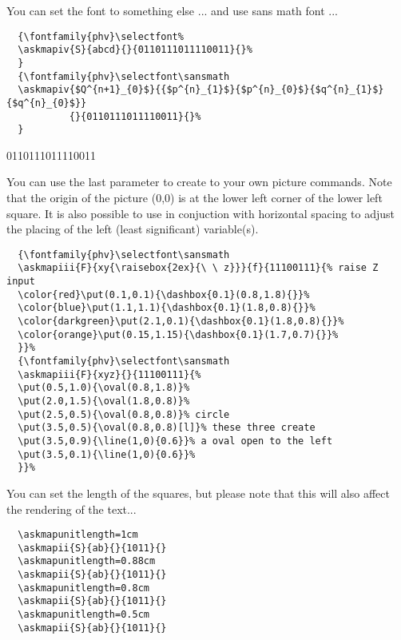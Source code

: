 \documentclass[a4paper,10pt]{ltxdoc}
\begin{document}
You can set the font to something else ... and use sans math font ...
\begin{verbatim}
  {\fontfamily{phv}\selectfont%
  \askmapiv{S}{abcd}{}{0110111011110011}{}%
  }
  {\fontfamily{phv}\selectfont\sansmath
  \askmapiv{$Q^{n+1}_{0}$}{{$p^{n}_{1}$}{$p^{n}_{0}$}{$q^{n}_{1}$}{$q^{n}_{0}$}}
           {}{0110111011110011}{}%
  }
\end{verbatim}
{\selectfont%
%
}
{\selectfont\sansmath
{}
         {}{0110111011110011}{}%
}
\bigskip\bigskip

You can use the last parameter to create to your own picture commands. Note
that the origin of the picture (0,0) is at the lower left corner of the lower
left square. It is also possible to use  in conjuction with
horizontal spacing to adjust the placing of the left (least significant)
variable(s).

\begin{verbatim}
  {\fontfamily{phv}\selectfont\sansmath
  \askmapiii{F}{xy{\raisebox{2ex}{\ \ z}}}{f}{11100111}{% raise Z input
  \color{red}\put(0.1,0.1){\dashbox{0.1}(0.8,1.8){}}%
  \color{blue}\put(1.1,1.1){\dashbox{0.1}(1.8,0.8){}}%
  \color{darkgreen}\put(2.1,0.1){\dashbox{0.1}(1.8,0.8){}}%
  \color{orange}\put(0.15,1.15){\dashbox{0.1}(1.7,0.7){}}%
  }}%
  {\fontfamily{phv}\selectfont\sansmath
  \askmapiii{F}{xyz}{}{11100111}{%
  \put(0.5,1.0){\oval(0.8,1.8)}%
  \put(2.0,1.5){\oval(1.8,0.8)}%
  \put(2.5,0.5){\oval(0.8,0.8)}% circle
  \put(3.5,0.5){\oval(0.8,0.8)[l]}% these three create
  \put(3.5,0.9){\line(1,0){0.6}}% a oval open to the left
  \put(3.5,0.1){\line(1,0){0.6}}%
  }}%
\end{verbatim}
{\selectfont\sansmath
{}}%
{\selectfont\sansmath
{}}%
\bigskip\bigskip

You can set the length of the squares, but please note that this will also
affect the rendering of the text...
\begin{verbatim}
  \askmapunitlength=1cm
  \askmapii{S}{ab}{}{1011}{}
  \askmapunitlength=0.88cm
  \askmapii{S}{ab}{}{1011}{}
  \askmapunitlength=0.8cm
  \askmapii{S}{ab}{}{1011}{}
  \askmapunitlength=0.5cm
  \askmapii{S}{ab}{}{1011}{}
\end{verbatim}
\end{document}
